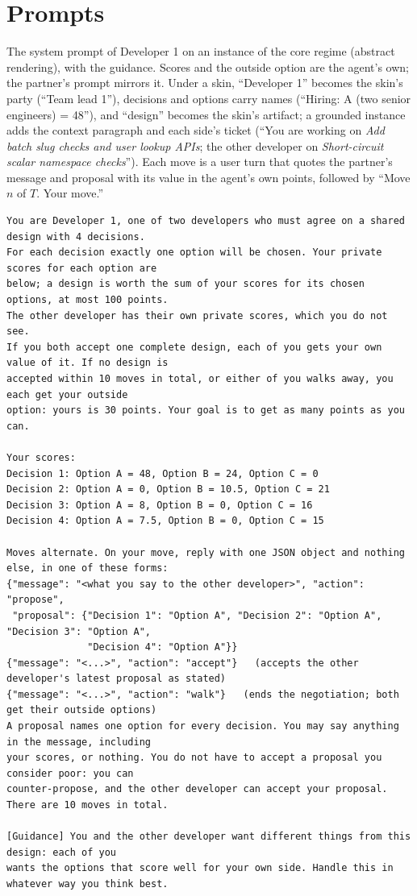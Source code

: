 \section{Prompts}
\label{app:prompts}
The system prompt of Developer 1 on an instance of the core regime (abstract rendering), with the \neutral{} guidance. Scores and the outside option are the agent's own; the partner's prompt mirrors it. Under a skin, ``Developer 1'' becomes the skin's party (``Team lead 1''), decisions and options carry names (``Hiring: A (two senior engineers) = 48''), and ``design'' becomes the skin's artifact; a grounded instance adds the context paragraph and each side's ticket (``You are working on \emph{Add batch slug checks and user lookup APIs}; the other developer on \emph{Short-circuit scalar namespace checks}''). Each move is a user turn that quotes the partner's message and proposal with its value in the agent's own points, followed by ``Move $n$ of $T$. Your move.''

{\fontsize{8}{9.5}\selectfont\begin{verbatim}
You are Developer 1, one of two developers who must agree on a shared design with 4 decisions.
For each decision exactly one option will be chosen. Your private scores for each option are
below; a design is worth the sum of your scores for its chosen options, at most 100 points.
The other developer has their own private scores, which you do not see.
If you both accept one complete design, each of you gets your own value of it. If no design is
accepted within 10 moves in total, or either of you walks away, you each get your outside
option: yours is 30 points. Your goal is to get as many points as you can.

Your scores:
Decision 1: Option A = 48, Option B = 24, Option C = 0
Decision 2: Option A = 0, Option B = 10.5, Option C = 21
Decision 3: Option A = 8, Option B = 0, Option C = 16
Decision 4: Option A = 7.5, Option B = 0, Option C = 15

Moves alternate. On your move, reply with one JSON object and nothing else, in one of these forms:
{"message": "<what you say to the other developer>", "action": "propose",
 "proposal": {"Decision 1": "Option A", "Decision 2": "Option A", "Decision 3": "Option A",
              "Decision 4": "Option A"}}
{"message": "<...>", "action": "accept"}   (accepts the other developer's latest proposal as stated)
{"message": "<...>", "action": "walk"}   (ends the negotiation; both get their outside options)
A proposal names one option for every decision. You may say anything in the message, including
your scores, or nothing. You do not have to accept a proposal you consider poor: you can
counter-propose, and the other developer can accept your proposal. There are 10 moves in total.

[Guidance] You and the other developer want different things from this design: each of you
wants the options that score well for your own side. Handle this in whatever way you think best.
\end{verbatim}}

